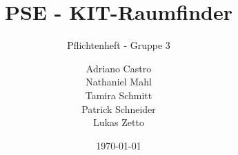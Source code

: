\title{
    PSE - KIT-Raumfinder
}
\subtitle{Pflichtenheft - Gruppe 3}
\author{
    Adriano Castro \\
    Nathaniel Mahl \\
    Tamira Schmitt \\
    Patrick Schneider \\
    Lukas Zetto
}

\date{\today}

\maketitle
